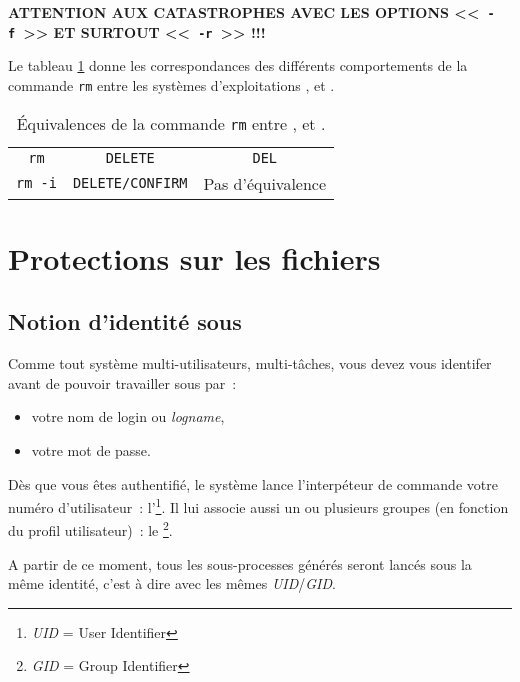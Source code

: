 \begin{center}
{\large
	{\bf
		ATTENTION AUX CATASTROPHES AVEC LES
		OPTIONS <<~{\tt -f}~>> ET SURTOUT <<~{\tt -r}~>> !!!
	}
}
\end{center}

Le tableau \ref{tab-cmds-equiv-rm} donne les correspondances des
diff{\'e}rents comportements de la commande {\tt rm} entre les syst{\`e}mes
d'exploitations {\Unix}, {\OpenVMS} et {\DOS}.

\begin{table}[hbtp]
\centering
\begin{tabular}{|c|c|c|}
	\hline
		{\Unix}			&	{\OpenVMS}		&	{\DOS}					\\
	\hline \hline
		{\tt rm}		&	{\tt DELETE}	&	{\tt DEL}				\\
		{\tt rm -i}		&	{\tt DELETE/CONFIRM}
											&	Pas d'{\'e}quivalence	\\
	\hline
\end{tabular}
\caption{\label{tab-cmds-equiv-rm}\'{E}quivalences de la commande
{\tt rm} entre {\Unix},{\OpenVMS} et {\DOS}.}
\end{table}

\section{\label{cmds-protect}Protections sur les fichiers}

\subsection{\label{cmds-unix-id}Notion d'identit{\'e} sous {\Unix}}

Comme tout syst{\`e}me multi-utilisateurs, multi-t{\^a}ches, vous devez vous
identifer avant de pouvoir travailler sous {\Unix} par~:
\begin{itemize}
	\item	votre nom de login ou {\sl logname},
	\item	votre mot de passe.
\end{itemize}

D{\`e}s que vous {\^e}tes authentifi{\'e}, le syst{\`e}me lance
l'interp{\'e}teur de commande votre num{\'e}ro d'utilisateur~:
l'\footnote{{\sl UID} = User Identifier}. Il lui
associe aussi un ou plusieurs groupes (en fonction du profil
utilisateur)~: le \footnote{{\sl GID} = Group Identifier}.

A partir de ce moment, tous les sous-processes g{\'e}n{\'e}r{\'e}s seront lanc{\'e}s
sous la m{\^e}me identit{\'e}, c'est {\`a} dire avec les m{\^e}mes {\sl UID}/{\sl GID}.

